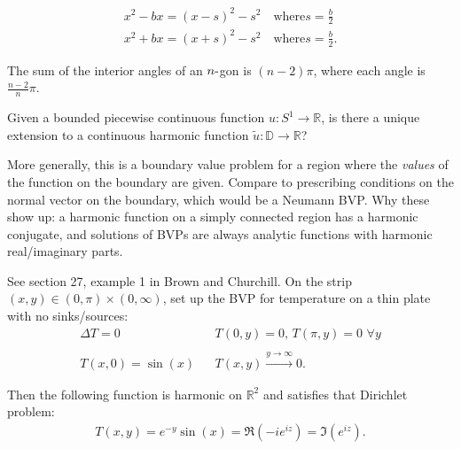 \begin{fact}

\begin{align*}
x^2 - bx = (x - s)^2 - s^2 \quad\text{where} s = \frac{b}{2} \\
x^2 + bx = (x + s)^2 - s^2 \quad\text{where} s = \frac{b}{2}
.\end{align*}

\end{fact}

\begin{fact}

The sum of the interior angles of an \(n{\hbox{-}}\)gon is \((n-2)\pi\),
where each angle is \(\frac{n-2}{n}\pi\).

\end{fact}

\begin{definition}

Given a bounded piecewise continuous function \(u:S^1\to {\mathbb{R}}\),
is there a unique extension to a continuous harmonic function
\(\tilde u: {\mathbb{D}}\to {\mathbb{R}}\)?

\end{definition}

\begin{remark}

More generally, this is a boundary value problem for a region where the
\emph{values} of the function on the boundary are given. Compare to
prescribing conditions on the normal vector on the boundary, which would
be a Neumann BVP. Why these show up: a harmonic function on a simply
connected region has a harmonic conjugate, and solutions of BVPs are
always analytic functions with harmonic real/imaginary parts.

\end{remark}

\begin{example}

See section 27, example 1 in Brown and Churchill. On the strip
\((x, y)\in (0, \pi) \times(0, \infty)\), set up the BVP for temperature
on a thin plate with no sinks/sources:
\begin{align*}
\Delta T = 0 && T(0, y) = 0,\, T(\pi, y) = 0 \,\,\forall y \\ \\
T(x, 0) = \sin(x) && T(x, y) \overset{y\to\infty}\longrightarrow 0
.\end{align*}

Then the following function is harmonic on \({\mathbb{R}}^2\) and
satisfies that Dirichlet problem:
\begin{align*}
T(x ,y) = e^{-y} \sin(x) = \Re(-ie^{iz}) = \Im(e^{iz})
.\end{align*}

\end{example}

